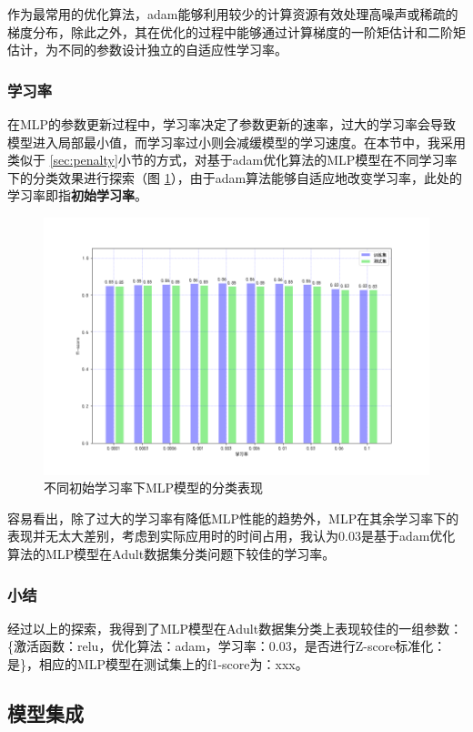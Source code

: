 \documentclass[12pt,a4paper]{article}
\theoremstyle{definition}
\begin{document}
{\vspace{0.01\linewidth}
作为最常用的优化算法，adam能够利用较少的计算资源有效处理高噪声或稀疏的梯度分布，除此之外，其在优化的过程中能够通过计算梯度的一阶矩估计和二阶矩估计，为不同的参数设计独立的自适应性学习率。

\subsubsection{学习率}

在MLP的参数更新过程中，学习率决定了参数更新的速率，过大的学习率会导致模型进入局部最小值，而学习率过小则会减缓模型的学习速度。在本节中，我采用类似于 \ref{sec:penalty}小节的方式，对基于adam优化算法的MLP模型在不同学习率下的分类效果进行探索（图 \ref{fig:lr}），由于adam算法能够自适应地改变学习率，此处的学习率即指\textbf{初始学习率}。

\begin{figure}[H]
	\centering
	\includegraphics[width=0.75\linewidth]{img/mlp_lr.png}
	\caption{不同初始学习率下MLP模型的分类表现}
	\label{fig:lr}
\end{figure}

容易看出，除了过大的学习率有降低MLP性能的趋势外，MLP在其余学习率下的表现并无太大差别，考虑到实际应用时的时间占用，我认为0.03是基于adam优化算法的MLP模型在Adult数据集分类问题下较佳的学习率。

\subsubsection{小结}

经过以上的探索，我得到了MLP模型在Adult数据集分类上表现较佳的一组参数：\{激活函数：relu，优化算法：adam，学习率：0.03，是否进行Z-score标准化：是\}，相应的MLP模型在测试集上的f1-score为：xxx。

\subsection{模型集成}

}
\end{document}
